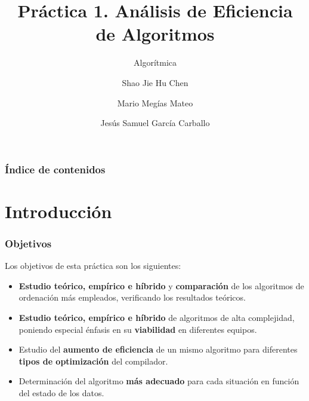 \documentclass[8pt, aspectratio=169]{beamer}
\author{Shao Jie Hu Chen \and Mario Megías Mateo \and Jesús Samuel García Carballo}
\title{Práctica 1. Análisis de Eficiencia de Algoritmos}
\subtitle{Algorítmica}
\institute{Universidad de Granada}
\begin{document}
	
	\begin{frame}[plain]
		\maketitle
	\end{frame}
	
	\begin{frame}
		\frametitle{Índice de contenidos}
		\tableofcontents
	\end{frame}

	\section{Introducción}

	\begin{frame}
		\frametitle{Objetivos}

            Los objetivos de esta práctica son los siguientes:
            \begin{itemize}
                \item \textbf{Estudio teórico, empírico e híbrido} y \textbf{comparación} de los algoritmos de ordenación más empleados, verificando los resultados teóricos.
                \item \textbf{Estudio teórico, empírico e híbrido} de algoritmos de alta complejidad, poniendo especial énfasis en su \textbf{viabilidad} en diferentes equipos. 
                \item Estudio del \textbf{aumento de eficiencia} de un mismo algoritmo para diferentes \textbf{tipos de optimización} del compilador. 
                \item Determinación del algoritmo \textbf{más adecuado} para cada situación en función del estado de los datos.
            \end{itemize}

	\end{frame}
\end{document}
